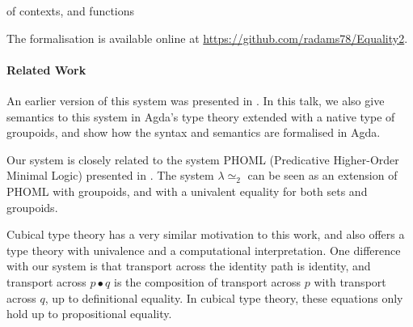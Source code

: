 \documentclass{easychair}
\newcommand{\LEtwo}{\ensuremath{\lambda \! \! \simeq_2}}
\begin{document}
of contexts, and functions


The formalisation is available online at \url{https://github.com/radams78/Equality2}.

\paragraph{Related Work}

An earlier version of this system was presented in \cite{ap:tsnhu}.  In this talk, we also give semantics to this system in Agda's type theory extended with a native type of groupoids, and show how the syntax and semantics are formalised in Agda.

Our system is closely related to the system PHOML (Predicative Higher-Order Minimal Logic) presented in \cite{abc:ncrpehoml}.  The system $\LEtwo$ can be seen as an extension of PHOML with groupoids, and with a univalent equality for both sets and groupoids.

Cubical type theory \cite{cchm:cubical, huber:canonicity} has a very similar motivation to this work, and also offers a type theory with univalence and a computational interpretation.  One difference with our system is that transport across the identity path is identity, and transport across $p \bullet q$ is the composition of transport across $p$ with transport across $q$, up to definitional equality.  In cubical type theory, these equations only hold up to propositional equality.



\end{document}
